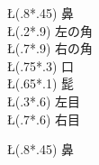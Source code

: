 \begin{figure}[htbp]
\begin{minipage}{.49\linewidth}
 \GridLineWidth{.2pt}
  \SetLabels 
  \T\L(.8*.45) 鼻\\
  \T\L(.2*.9) 左の角\\
  \T\L(.7*.9) 右の角\\ 
  \T\L(.75*.3)  口\\ 
  \T\L(.65*.1) 髭\\ 
  \T\L(.3*.6) 左目\\ 
  \T\L(.7*.6)  右目\\ 
  \endSetLabels
  \ShowGrid
  \strut{}%
\end{minipage}
\hfil
\begin{minipage}{.49\linewidth}
  \SetLabels 
  \T\L(.8*.45) 鼻\\

\end{minipage}
\end{figure}
